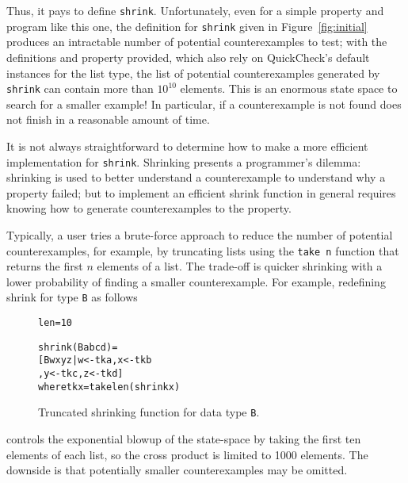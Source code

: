 \documentclass[10pt]{sigplanconf}
\newenvironment{code}{\begin{alltt}}{\end{alltt}}
\newcommand{\ttp}[1]{\texttt{#1}}
\begin{document}
Thus, it pays to define \ttp{shrink}.  Unfortunately, even for a simple property
and program like this one, the definition for \ttp{shrink} given in
Figure~\ref{fig:initial} produces an intractable number of potential
counterexamples to test; with the definitions and property provided, which also
rely on QuickCheck's default instances for the list type, the list of potential
counterexamples generated by \ttp{shrink} can contain more than $10^{10}$
elements.  This is an enormous state space to search for a smaller example!  In
particular, if a counterexample is not found does not finish in a reasonable
amount of time.

It is not always straightforward to determine how to make a more efficient
implementation for \ttp{shrink}.  Shrinking presents a programmer's dilemma:
shrinking is used to better understand a counterexample to understand why a
property failed; but to implement an efficient shrink function in general
requires knowing how to generate counterexamples to the property.

Typically, a user tries a brute-force approach to reduce the number of potential
counterexamples, for example, by truncating lists using the \ttp{take n} function
that returns the first $n$ elements of a list.  The trade-off is quicker
shrinking with a lower probability of finding a smaller counterexample.  For
example, redefining shrink for type \ttp{B} as follows
%


\begin{figure}[ht]
\begin{code}
len = 10

shrink (B a b c d) = 
  [ B w x y z | w <- tk a, x <- tk b
              , y <- tk c, z <- tk d ]
  where tk x = take len (shrink x)
\end{code}
  \caption{Truncated shrinking function for data type \ttp{B}.}
  \label{lst:newshrink}
\end{figure}

%
\noindent
controls the exponential blowup of the state-space by taking the first ten
elements of each list, so the cross product is limited to 1000 elements.  The
downside is that potentially smaller counterexamples may be omitted.
\end{document}
